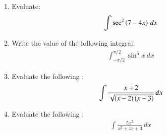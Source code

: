 \begin{enumerate}
\item Evaluate:
    \begin{align*}
        \int \sec^2 \left(7-4x\right) \, dx
    \end{align*}

\item Write the value of the following integral:
    \begin{align*}
        \int_{-\pi / 2}^{\pi / 2} \sin^5 x \, dx
    \end{align*}

\item Evaluate the following :
    \begin{align*}
        \int \frac{x + 2}{\sqrt{\left(x-2\right) \left(x-3\right)}} \, dx
    \end{align*}

\item Evaluate the following :
    \begin{align*}
        \int \frac{5 x^2}{x^2 + 4x + 3} \, dx
    \end{align*}



\end{enumerate}
